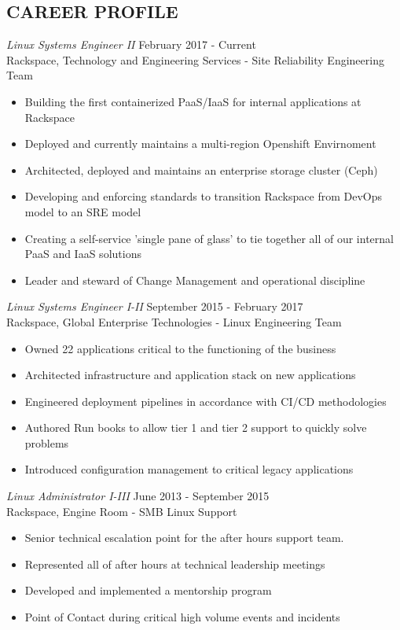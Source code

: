 \documentclass[margin]{res}
\begin{document}
\begin{resume}
\section{CAREER PROFILE} 
		{\sl Linux Systems Engineer II} \hfill February 2017 - Current \\
		Rackspace, Technology and Engineering Services - Site Reliability Engineering Team
		\begin{itemize} \itemsep -2pt
		\item Building the first containerized PaaS/IaaS for internal applications at Rackspace
		\item Deployed and currently maintains a multi-region Openshift Envirnoment
		\item Architected, deployed and maintains an enterprise storage cluster (Ceph)
		\item Developing and enforcing standards to transition Rackspace from DevOps model to an SRE model
		\item Creating a self-service 'single pane of glass' to tie together all of our internal PaaS and IaaS solutions
		\item Leader and steward of Change Management and operational discipline

		\end{itemize}
		{\sl Linux Systems Engineer I-II} \hfill September 2015 - February 2017 \\ 
		Rackspace, Global Enterprise Technologies - Linux Engineering Team
                \begin{itemize} \itemsep -2pt
		\item Owned 22 applications critical to the functioning of the business
		\item Architected infrastructure and application stack on new applications
		\item Engineered deployment pipelines in accordance with CI/CD methodologies
		\item Authored Run books to allow tier 1 and tier 2 support to quickly solve problems
		\item Introduced configuration management to critical legacy applications
		\end{itemize}

		{\sl Linux Administrator I-III} \hfill June 2013 - September 2015 \\
                Rackspace, Engine Room - SMB Linux Support
                \begin{itemize}  \itemsep -2pt
                \item  Senior technical escalation point for the after hours support team.
		\item  Represented all of after hours at technical leadership meetings 
                \item  Developed and implemented a mentorship program
		\item  Point of Contact during critical high volume events and incidents
		\end{itemize}
 

\end{resume}
\end{document}
